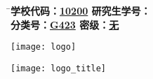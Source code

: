 %
\thispagestyle{empty}
\cleardoublepage

% 


\begin{tabbing}
  
\hspace{3em}

\= \textbf{\songti  学校代码：\underline{10200} \hspace{10em} \songti 研究生学号：\underline{\nsauthorid} } \\[-1.5mm]

\>\textbf{\songti 分\hspace{0.65em}类\hspace{0.65em}号：\underline{G423} \hspace{10em} \songti 密\hspace{3em}级：\underline{无} }\\[-1.5mm]
\end{tabbing}

%
\vspace{-7mm}
\begin{center}
   \texttt{[image: logo]}
\end{center}
%


\vspace{-4mm}
%
\begin{center}
  \texttt{[image: logo\_title]}
\end{center}


\vspace{-2mm}
\centerline{}
%
\vspace{17mm}

\begin{center}
  \begin{spacing}{1}
   \heiti \textbf{\nstitlec}
  \end{spacing}
\end{center}
\vspace{-7.5ex}
\begin{center}
  \begin{spacing}{1.5}
   \textbf{\nstitlee}
  \end{spacing}
\end{center}




